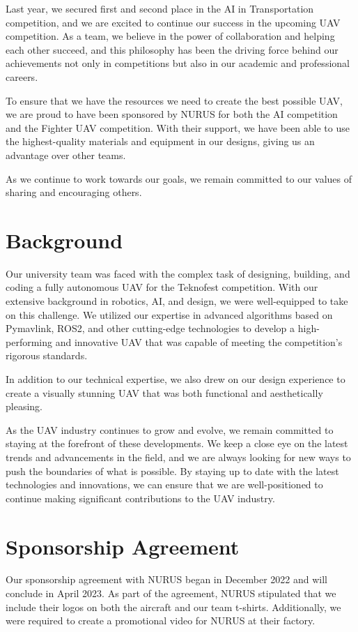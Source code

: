\documentclass{article}
\begin{document}
Last year, we secured first and second place in the AI in Transportation competition, and we are excited to continue our success in the upcoming UAV competition. As a team, we believe in the power of collaboration and helping each other succeed, and this philosophy has been the driving force behind our achievements not only in competitions but also in our academic and professional careers.

To ensure that we have the resources we need to create the best possible UAV, we are proud to have been sponsored by NURUS for both the AI competition and the Fighter UAV competition. With their support, we have been able to use the highest-quality materials and equipment in our designs, giving us an advantage over other teams.

As we continue to work towards our goals, we remain committed to our values of sharing and encouraging others.
\FloatBarrier

\section{Background}

Our university team was faced with the complex task of designing, building, and coding a fully autonomous UAV for the Teknofest competition. With our extensive background in robotics, AI, and design, we were well-equipped to take on this challenge. We utilized our expertise in advanced algorithms based on Pymavlink, ROS2, and other cutting-edge technologies to develop a high-performing and innovative UAV that was capable of meeting the competition's rigorous standards.

In addition to our technical expertise, we also drew on our design experience to create a visually stunning UAV that was both functional and aesthetically pleasing.

As the UAV industry continues to grow and evolve, we remain committed to staying at the forefront of these developments. We keep a close eye on the latest trends and advancements in the field, and we are always looking for new ways to push the boundaries of what is possible. By staying up to date with the latest technologies and innovations, we can ensure that we are well-positioned to continue making significant contributions to the UAV industry.
\section{Sponsorship Agreement}

Our sponsorship agreement with NURUS began in December 2022 and will conclude in April 2023. As part of the agreement, NURUS stipulated that we include their logos on both the aircraft and our team t-shirts. Additionally, we were required to create a promotional video for NURUS at their factory.
\end{document}
